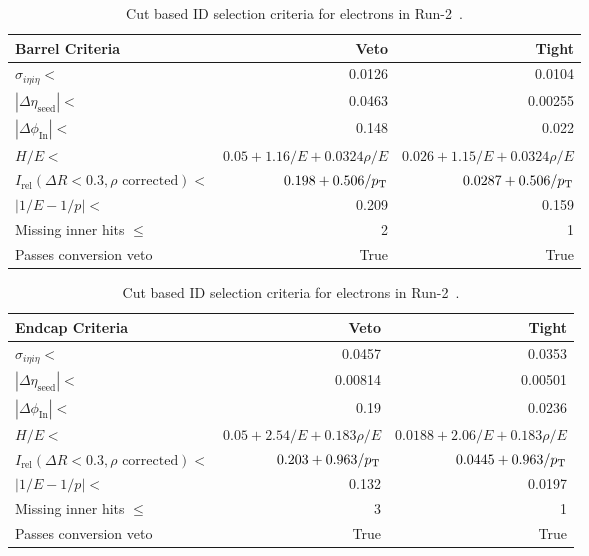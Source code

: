 \begin{table}[htb!]
	\centering
	\caption[Cut based ID selection criteria for electrons in Run-2.]{Cut based ID selection criteria for electrons in Run-2~\cite{electronid}.}
	\label{tab:electronID}
	\begin{tabular}{l | r | r}
		\hline
		Barrel Criteria & Veto & Tight \\
		\hline
		\hline
		$\sigma_{i\eta i\eta}<$ & 0.0126 & 0.0104 \\
		$|\Delta\eta_\text{seed}|<$ & 0.0463 & 0.00255 \\
		$|\Delta\phi_\text{In}|<$ & 0.148 & 0.022 \\
		$H/E<$ & $0.05+1.16/E+0.0324\rho/E$ & $0.026+1.15/E+0.0324\rho/E$ \\
		$I_\text{rel}(\Delta R<0.3,\rho\text{ corrected})<$ & $0.198+0.506/p_{\mathrm{T}}$ & $0.0287+0.506/p_{\mathrm{T}}$\\
		$|1/E-1/p|<$  & 0.209 & 0.159 \\
		Missing inner hits $\leq$ & 2 & 1 \\
		Passes conversion veto & True & True\\
		\hline
	\end{tabular}
	\centering
	\begin{tabular}{l | r | r}
		\hline
		Endcap Criteria & Veto & Tight \\
		\hline
		\hline
		$\sigma_{i\eta i\eta}<$ & 0.0457 & 0.0353 \\
		$|\Delta\eta_\text{seed}|<$ & 0.00814 & 0.00501 \\
		$|\Delta\phi_\text{In}|<$ & 0.19 & 0.0236 \\
		$H/E<$ & $0.05+2.54/E+0.183\rho/E$ & $0.0188+2.06/E+0.183\rho/E$ \\
		$I_\text{rel}(\Delta R<0.3,\rho\text{ corrected})<$ & $0.203+0.963/p_{\mathrm{T}}$ & $0.0445+0.963/p_{\mathrm{T}}$\\
		$|1/E-1/p|<$ & 0.132 & 0.0197 \\
		Missing inner hits $\leq$ & 3 & 1 \\
		Passes conversion veto & True & True\\
		\hline
	\end{tabular}
\end{table}

